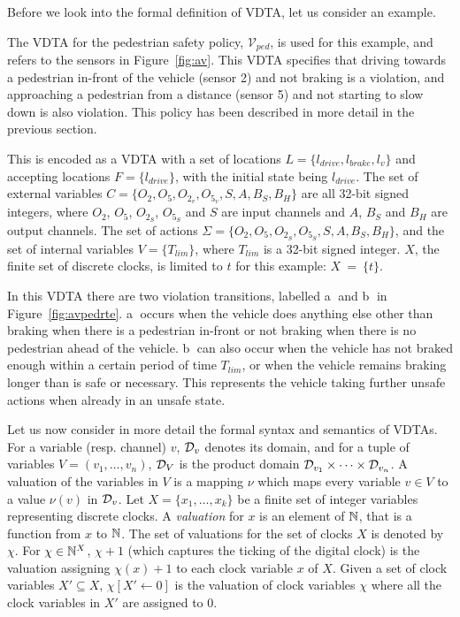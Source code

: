 Before we look into the formal definition of VDTA, let us consider an example.

\begin{example}
	The \ac{VDTA} for the pedestrian safety policy, $\mathcal{V}_{ped}$, is used for this example, and refers to the sensors in Figure~\ref{fig:av}.
	This \ac{VDTA} specifies that driving towards a pedestrian in-front of the vehicle (sensor 2) and not braking is a violation, and approaching a pedestrian from a distance (sensor 5) and not starting to slow down is also violation.
	This policy has been described in more detail in the previous section.
	
	This is encoded as a \ac{VDTA} with a set of locations $L = \{l_{drive}, l_{brake}, l_v\}$ and accepting locations $F = \{l_{drive}\}$, with the initial state being $l_{drive}$.
	The set of external variables $C = \{O_2, O_5, O_{2_v}, O_{5_v}, S, A, B_S, B_H\}$ are all 32-bit signed integers, where $O_2$, $O_5$, $O_{2_S}$, $O_{5_S}$ and $S$ are input channels and $A$, $B_S$ and $B_H$ are output channels.
	The set of actions $\Sigma = \{O_2, O_5, O_{2_S}, O_{5_S}, S, A, B_S, B_H\}$, and the set of internal variables $V = \{T_{lim}\}$, where $T_{lim}$ is a 32-bit signed integer.
	$X$, the finite set of discrete clocks, is limited to $t$ for this example: $X~=~\{t\}$.
	
	In this \ac{VDTA} there are two violation transitions, labelled \textcircled{a} and \textcircled{b} in Figure~\ref{fig:avpedrte}.
	\textcircled{a} occurs when the vehicle does anything else other than braking when there is a pedestrian in-front or not braking when there is no pedestrian ahead of the vehicle.
	\textcircled{b} can also occur when the vehicle has not braked enough within a certain period of time $T_{lim}$, or when the vehicle remains braking longer than is safe or necessary.
	This represents the vehicle taking further unsafe actions when already in an unsafe state.
\end{example}


Let us now consider in more detail the formal syntax and semantics of VDTAs.
%
For a variable (resp. channel) $v$, ${\cal D}_v$ denotes its domain,
and for a tuple of variables $V= (v_1, \ldots, v_n)$,
${\cal D}_V$ is the product domain ${\cal D}_{v_1} \times \cdots \times {\cal D}_{v_n}$.
A valuation of the variables in $V$
is a mapping $\nu$ which maps every variable $v \in V$ to a value $\nu(v)$ in ${\cal D}_v$.
%
Let $X=\{x_1,\ldots, x_k\}$ be a finite set of integer variables representing discrete clocks.
%
A {\em valuation} for $x$ is an element of $\mathbb{N}$, that is a function from $x$ to $\mathbb{N}$.
The set of valuations for the set of clocks $X$ is denoted by $\chi$.
%
For $\chi\in\mathbb{N}^X$, $\chi+1$ (which captures the ticking of the digital clock) is the valuation assigning $\chi(x)+1$ to each clock variable $x$ of $X$.
Given a set of clock variables $X' \subseteq X$, $\chi[X' \leftarrow 0]$ is the valuation of clock variables $\chi$ where all the clock variables in $X'$ are assigned to $0$.

